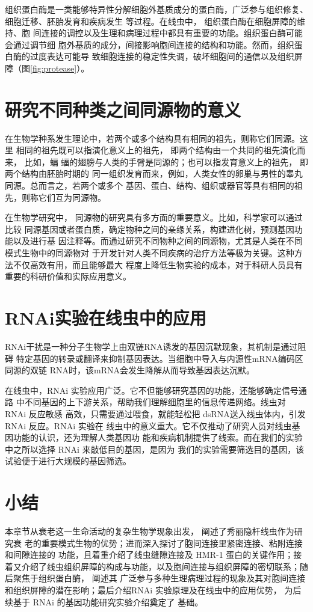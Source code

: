 组织蛋白酶是一类能够特异性分解细胞外基质成分的蛋白酶，广泛参与组织修复、细胞迁移、胚胎发育和疾病发生 等过程。在线虫中， 组织蛋白酶在细胞屏障的维持、胞 间连接的调控以及生理和病理过程中都具有重要的功能。组织蛋白酶可能会通过调节细 胞外基质的成分，间接影响胞间连接的结构和功能。然而，组织蛋白酶的过度表达可能导 致细胞连接的稳定性失调，破坏细胞间的通信以及组织屏障（图\ref{fig:protease}）。

\section{研究不同种类之间同源物的意义}

在生物学种系发生理论中，若两个或多个结构具有相同的祖先，则称它们同源。这里 相同的祖先既可以指演化意义上的祖先， 即两个结构由一个共同的祖先演化而来， 比如，蝙 蝠的翅膀与人类的手臂是同源的；也可以指发育意义上的祖先， 即两个结构由胚胎时期的 同一组织发育而来，例如，人类女性的卵巢与男性的睾丸同源。总而言之，若两个或多个 基因、蛋白、结构、组织或器官等具有相同的祖先，则称它们互为同源物。

在生物学研究中， 同源物的研究具有多方面的重要意义。比如，科学家可以通过比较 同源基因或者蛋白质，确定物种之间的亲缘关系，构建进化树，预测基因功能以及进行基 因注释等。而通过研究不同物种之间的同源物，尤其是人类在不同模式生物中的同源物对 于开发针对人类不同疾病的治疗方法等极为关键。这种方法不仅高效有用，而且能够最大 程度上降低生物实验的成本，对于科研人员具有重要的科研价值和实际应用意义。

\section{RNAi实验在线虫中的应用}

RNAi干扰是一种分子生物学上由双链RNA诱发的基因沉默现象，其机制是通过阻碍  特定基因的转录或翻译来抑制基因表达。当细胞中导入与内源性mRNA编码区同源的双链 RNA时，该mRNA会发生降解从而导致基因表达沉默。
	
在线虫中，RNAi 实验应用广泛。它不但能够研究基因的功能，还能够确定信号通路 中不同基因的上下游关系，帮助我们理解细胞里的信息传递网络。线虫对 RNAi 反应敏感 高效，只需要通过喂食，就能轻松把 dsRNA送入线虫体内，引发 RNAi 反应。RNAi 实验在 线虫中的意义重大。它不仅推动了研究人员对线虫基因功能的认识，还为理解人类基因功 能和疾病机制提供了线索。而在我们的实验中之所以选择 RNAi 来敲低目的基因，是因为 我们的实验需要筛选目的基因，该试验便于进行大规模的基因筛选。

\section{小结}

本章节从衰老这一生命活动的复杂生物学现象出发， 阐述了秀丽隐杆线虫作为研究衰 老的重要模式生物的优势；进而深入探讨了胞间连接里紧密连接、粘附连接和间隙连接的 功能，且着重介绍了线虫缝隙连接及 HMR-1 蛋白的关键作用；接着又介绍了线虫组织屏障的构成与功能，以及胞间连接与组织屏障的密切联系；随后聚焦于组织蛋白酶， 阐述其 广泛参与多种生理病理过程的现象及其对胞间连接和组织屏障的潜在影响；最后介绍RNAi 实验原理及在线虫中的应用优势， 为后续基于 RNAi 的基因功能研究实验介绍奠定了 基础。
